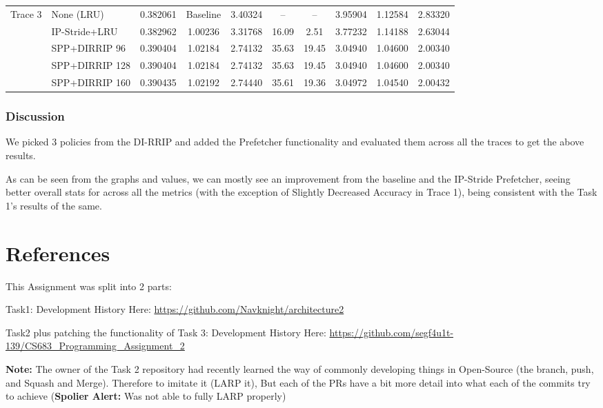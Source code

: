\documentclass[11pt,a4paper]{article}
\begin{document}
\begin{table}[H]
{\begin{tabular}{@{}llcccccccc@{}}
      \midrule

      \multirow{5}{*}{Trace 3}
        & None (LRU) & 0.382061 & Baseline & 3.40324 & -- & -- & 3.95904 & 1.12584 & 2.83320 \\
        & IP-Stride+LRU & 0.382962 & 1.00236 & 3.31768 & 16.09 & 2.51 & 3.77232 & 1.14188 & 2.63044 \\
        & SPP+DIRRIP 96 & 0.390404 & 1.02184 & 2.74132 & 35.63 & 19.45 & 3.04940 & 1.04600 & 2.00340 \\
        & SPP+DIRRIP 128 & 0.390404 & 1.02184 & 2.74132 & 35.63 & 19.45 & 3.04940 & 1.04600 & 2.00340 \\
        & SPP+DIRRIP 160 & 0.390435 & 1.02192 & 2.74440 & 35.61 & 19.36 & 3.04972 & 1.04540 & 2.00432 \\

      \bottomrule
    \end{tabular}%
    }
\end{table}

\subsubsection{Discussion}

We picked 3 policies from the DI-RRIP and added the Prefetcher functionality and evaluated them across all the traces to get the above results.

As can be seen from the graphs and values, we can mostly see an improvement from the baseline and the IP-Stride Prefetcher, seeing better overall stats for across all the metrics (with the exception of Slightly Decreased Accuracy in Trace 1), being consistent with the Task 1's results of the same. 



\section{References}
This Assignment was split into 2 parts:

Task1: Development History Here: \url{https://github.com/Navknight/architecture2}


Task2 plus patching the functionality of Task 3: Development History Here: \url{https://github.com/segf4u1t-139/CS683_Programming_Assignment_2}

\textbf{Note: }The owner of the Task 2 repository had recently learned the way of commonly developing things in Open-Source (the branch, push, and Squash and Merge). Therefore to imitate it (LARP it), But each of the PRs have a bit more detail into what each of the commits try to achieve (\textbf{Spolier Alert:} Was not able to fully LARP properly)
\end{document}
